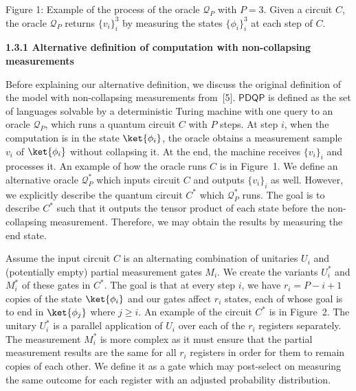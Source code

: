 \documentclass[10pt,a4paper]{article}
\begin{document}
Figure 1: Example of the process of the oracle $\mathcal{Q}_{P}$ with $P=3$. Given a circuit $C$, the oracle $\mathcal{Q}_{P}$ returns $\{v_{i}\}_{i}^{3}$ by measuring the states $\{\phi_{i}\}_{i}^{3}$ at each step of $C$.



\par\medskip\noindent\textbf{
1.3.1 Alternative definition of computation with non-collapsing measurements}\par




Before explaining our alternative definition, we discuss the original definition of the model with non-collapsing measurements from [5]. $\mathsf{PDQP}$ is defined as the set of languages solvable by a deterministic Turing machine with one query to an oracle $\mathcal{Q}_{P}$, which runs a quantum circuit $C$ with $P$ steps. At step $i$, when the computation is in the state $\ket{\phi_{i}}$, the oracle obtains a measurement sample $v_{i}$ of $\ket{\phi_{i}}$ without collapsing it. At the end, the machine receives $\{v_{i}\}_{i}$ and processes it. An example of how the oracle runs $C$ is in Figure 1. We define an alternative oracle $\mathcal{Q}_{P}^{*}$ which inputs circuit $C$ and outputs $\{v_{i}\}_{i}$ as well. However, we explicitly describe the quantum circuit $C^{*}$ which $\mathcal{Q}_{P}^{*}$ runs. The goal is to describe $C^{*}$ such that it outputs the tensor product of each state before the non-collapsing measurement. Therefore, we may obtain the results by measuring the end state.\par




Assume the input circuit $C$ is an alternating combination of unitaries $U_{i}$ and (potentially empty) partial measurement gates $M_{i}$. We create the variants $U^{*}_{i}$ and $M^{*}_{i}$ of these gates in $C^{*}$. The goal is that at every step $i$, we have $r_{i}=P-i+1$ copies of the state $\ket{\phi_{i}}$ and our gates affect $r_{i}$ states, each of whose goal is to end in $\ket{\phi_{j}}$ where $j\geq i$. An example of the circuit $C^{*}$ is in Figure 2. The unitary $U^{*}_{i}$ is a parallel application of $U_{i}$ over each of the $r_{i}$ registers separately. The measurement $M^{*}_{i}$ is more complex as it must ensure that the partial measurement results are the same for all $r_{i}$ registers in order for them to remain copies of each other. We define it as a gate which may post-select on measuring the same outcome for each register with an adjusted probability distribution.\par
\end{document}
